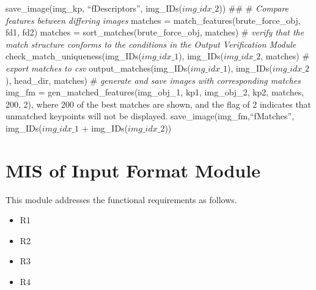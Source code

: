 \documentclass[12pt, titlepage]{article}
\begin{document}
save\_image(img\_kp, ``fDescriptors'', img\_IDs($img\_idx\_{2}$))\newline \newline
\#\# \newline \newline
\# \textit{Compare features between differing images} \newline 
matches = match\_features(brute\_force\_obj, fd1, fd2) \newline
matches = sort\_matches(brute\_force\_obj, matches) \newline \newline
\# \textit{verify that the match structure conforms to the conditions in the
Output Verification Module} \newline 
check\_match\_uniqueness(img\_IDs($img\_idx\_{1}$), img\_IDs($img\_idx\_{2}$, matches)\newline \newline
\# \textit{export matches to csv} \newline
output\_matches(img\_IDs($img\_idx\_{1}$), img\_IDs($img\_idx\_{2}$), head\_dir, matches) \newline \newline
\# \textit{generate and save images with corresponding matches} \newline
img\_fm = gen\_matched\_features(img\_obj\_1, kp1, img\_obj\_2, kp2, matches, 200, 2), where 200 of the best matches are shown,
and the flag of 2 indicates that unmatched keypoints will not be displayed.\newline
save\_image(img\_fm,``fMatches'', img\_IDs($img\_idx\_{1}$ + img\_IDs($img\_idx\_{2}$))


\section{MIS of Input Format Module} \label{mIF}
This module addresses the functional requirements as follows.
\begin{itemize}
  \item R1
  \item R2
  \item R3
  \item R4
\end{itemize}
\end{document}
